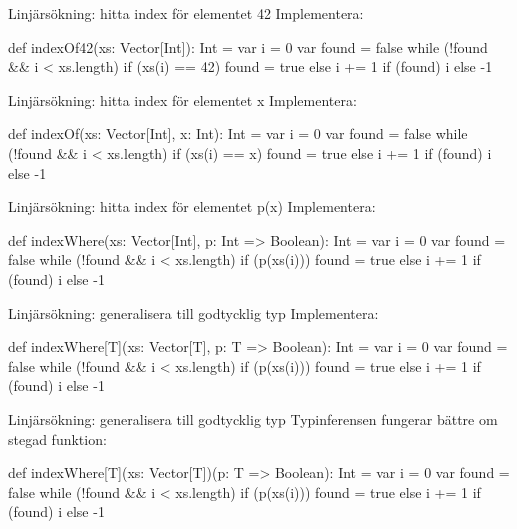 \begin{Slide}{Linjärsökning: hitta index för elementet 42}
Implementera:\\ 
\pause
\begin{Code}
def indexOf42(xs: Vector[Int]): Int = {
  var i = 0
  var found = false
  while (!found && i < xs.length) {
    if (xs(i) == 42) found = true 
    else i += 1
  }
  if (found) i else -1
} 
\end{Code}
\end{Slide}

\begin{Slide}{Linjärsökning: hitta index för elementet x}
Implementera:\\ 
\pause
\begin{Code}
def indexOf(xs: Vector[Int], x: Int): Int = {
  var i = 0
  var found = false
  while (!found && i < xs.length) {
    if (xs(i) == x) found = true 
    else i += 1
  }
  if (found) i else -1
} 
\end{Code}
\end{Slide}

\begin{Slide}{Linjärsökning: hitta index för elementet p(x)}\SlideFontSmall
Implementera:\\ 
\pause
\begin{Code}
def indexWhere(xs: Vector[Int], p: Int => Boolean): Int = {
  var i = 0
  var found = false
  while (!found && i < xs.length) {
    if (p(xs(i))) found = true 
    else i += 1
  }
  if (found) i else -1
} 
\end{Code}
\end{Slide}

\begin{Slide}{Linjärsökning: generalisera till godtycklig typ}\SlideFontSmall
Implementera:\\ 
\pause
\begin{Code}
def indexWhere[T](xs: Vector[T], p: T => Boolean): Int = {
  var i = 0
  var found = false
  while (!found && i < xs.length) {
    if (p(xs(i))) found = true 
    else i += 1
  }
  if (found) i else -1
} 
\end{Code}
\end{Slide}

\begin{Slide}{Linjärsökning: generalisera till godtycklig typ}\SlideFontSmall
Typinferensen fungerar bättre om stegad funktion:\\ 
\begin{Code}
def indexWhere[T](xs: Vector[T])(p: T => Boolean): Int = {
  var i = 0
  var found = false
  while (!found && i < xs.length) {
    if (p(xs(i))) found = true 
    else i += 1
  }
  if (found) i else -1
} 
\end{Code}
\end{Slide}


